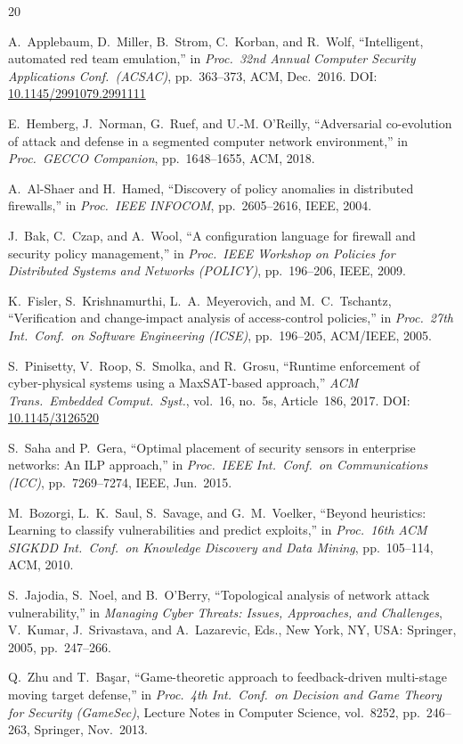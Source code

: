 \documentclass[journal]{IEEEtran}
\begin{document}
\begin{thebibliography}{20}

A.~Applebaum, D.~Miller, B.~Strom, C.~Korban, and R.~Wolf,
``Intelligent, automated red team emulation,''
in \textit{Proc.\ 32nd Annual Computer Security Applications
Conf.\ (ACSAC)}, pp.~363--373, ACM, Dec.~2016.
DOI: \href{https://doi.org/10.1145/2991079.2991111}
{10.1145/2991079.2991111}

E.~Hemberg, J.~Norman, G.~Ruef, and U.-M. O'Reilly,
``Adversarial co-evolution of attack and defense in a
segmented computer network environment,''
in \textit{Proc.\ GECCO Companion}, pp.~1648--1655,
ACM, 2018.


A.~Al-Shaer and H.~Hamed,
``Discovery of policy anomalies in distributed firewalls,''
in \textit{Proc.\ IEEE INFOCOM}, pp.~2605--2616, IEEE, 2004.

J.~Bak, C.~Czap, and A.~Wool,
``A configuration language for firewall and security policy
management,''
in \textit{Proc.\ IEEE Workshop on Policies for Distributed
Systems and Networks (POLICY)}, pp.~196--206, IEEE, 2009.

K.~Fisler, S.~Krishnamurthi, L.~A.~Meyerovich, and
M.~C.~Tschantz,
``Verification and change-impact analysis of access-control
policies,''
in \textit{Proc.\ 27th Int.\ Conf.\ on Software Engineering
(ICSE)}, pp.~196--205, ACM/IEEE, 2005.

S.~Pinisetty, V.~Roop, S.~Smolka, and R.~Grosu,
``Runtime enforcement of cyber-physical systems using a
MaxSAT-based approach,''
\textit{ACM Trans.\ Embedded Comput.\ Syst.}, vol.~16,
no.~5s, Article~186, 2017.
DOI: \href{https://doi.org/10.1145/3126520}{10.1145/3126520}

S.~Saha and P.~Gera,
``Optimal placement of security sensors in enterprise
networks: An ILP approach,''
in \textit{Proc.\ IEEE Int.\ Conf.\ on Communications
(ICC)}, pp.~7269--7274, IEEE, Jun.~2015.

M.~Bozorgi, L.~K.~Saul, S.~Savage, and G.~M.~Voelker,
``Beyond heuristics: Learning to classify vulnerabilities and
predict exploits,''
in \textit{Proc.\ 16th ACM SIGKDD Int.\ Conf.\ on Knowledge
Discovery and Data Mining}, pp.~105--114, ACM, 2010.


S.~Jajodia, S.~Noel, and B.~O'Berry,
``Topological analysis of network attack vulnerability,''
in \textit{Managing Cyber Threats: Issues, Approaches, and
Challenges}, V.~Kumar, J.~Srivastava, and A.~Lazarevic,
Eds., New York, NY, USA: Springer, 2005, pp.~247--266.

Q.~Zhu and T.~Ba\c{s}ar,
``Game-theoretic approach to feedback-driven multi-stage
moving target defense,''
in \textit{Proc.\ 4th Int.\ Conf.\ on Decision and Game
Theory for Security (GameSec)}, Lecture Notes in Computer
Science, vol.~8252, pp.~246--263, Springer, Nov.~2013.

\end{thebibliography}
\end{document}
